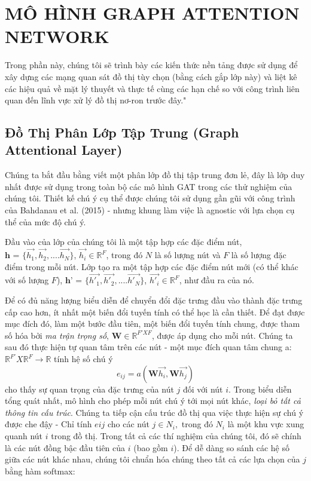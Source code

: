 \chapter{MÔ HÌNH GRAPH ATTENTION NETWORK}
\label{chap:MÔ HÌNH GRAPH ATTENTION NETWORK}


Trong phần này, chúng tôi sẽ trình bày các kiến thức nền tảng được sử dụng để xây dựng các mạng quan sát đồ thị tùy chọn (bằng cách gắp lớp này) và liệt kê các hiệu quả về mặt lý thuyết và thực tế cùng các hạn chế so với công trình liên quan đến lĩnh vực xử lý đồ thị nơ-ron trước đây."

\section{Đồ Thị Phân Lớp Tập Trung (Graph Attentional Layer)}
\label{sec:Đồ Thị Phân Lớp Tập Trung (Graph Attentional Layer)}

Chúng ta bắt đầu bằng viết một phân lớp đồ thị tập trung đơn lẻ, đây là lớp duy nhất được sử dụng trong toàn bộ các mô hình GAT trong các thử nghiệm của chúng tôi. Thiết kế chú ý cụ thể được chúng tôi sử dụng gần gũi với công trình của Bahdanau et al. (2015) - nhưng khung làm việc là agnostic với lựa chọn cụ thể của mức độ chú ý.

Đầu vào của lớp của chúng tôi là một tập hợp các đặc điểm nút, 
\(\textbf{h = } \{\vec{h_1}, \vec{h_2}, .... \vec{h_N} \}\), 
\(\vec{h_i} \in \mathbb{R}^F\),
trong đó $N$ là số lượng nút và $F$ là số lượng đặc điểm trong mỗi nút. 
Lớp tạo ra một tập hợp các đặc điểm nút mới (có thể khác với số lượng $F$), 
$\textbf{h' = } \{\vec{h'_1}, \vec{h'_2}, .... \vec{h'_N} \}$, $\vec{h'_i} \in \mathbb{R}^F $,
như đầu ra của nó.

Để có đủ năng lượng biểu diễn để chuyển đổi đặc trưng đầu vào thành đặc trưng cấp cao hơn, ít nhất một biến đổi tuyến tính có thể học là cần thiết. Để đạt được mục đích đó, làm một bước đầu tiên, một biến đổi tuyến tính chung, được tham số hóa bởi \textit{ma trận trọng số}, 
\(\textbf{W} \in {\mathbb{R}^{F' X F}}\), 
được áp dụng cho mỗi nút. Chúng ta sau đó thực hiện tự quan tâm trên các nút - một mục đích quan tâm chung a: 
\(\mathbb{R}^{F'} X \mathbb{R}^{F} \to \mathbb{R}\) 
tính hệ số chú ý
\[ e_{ij} = a(\textbf{W}\vec{h_i}, \textbf{W}\vec{h_j}) \]
cho thấy sự quan trọng của đặc trưng của nút $j$ đối với nút $i$. Trong biểu diễn tổng quát nhất, mô hình cho phép mỗi nút chú ý tới mọi nút khác, \textit{loại bỏ tất cả thông tin cấu trúc}. Chúng ta tiếp cận cấu trúc đồ thị qua việc thực hiện sự chú ý được che đậy - Chỉ tính $eij$ cho các nút $j \in N_i,$ trong đó $N_i$ là một khu vực xung quanh nút $i$ trong đồ thị. Trong tất cả các thí nghiệm của chúng tôi, đó sẽ chính là các nút đồng bậc đầu tiên của $i$ (bao gồm $i$). Để dễ dàng so sánh các hệ số giữa các nút khác nhau, chúng tôi chuẩn hóa chúng theo tất cả các lựa chọn của $j$ bằng hàm softmax:

